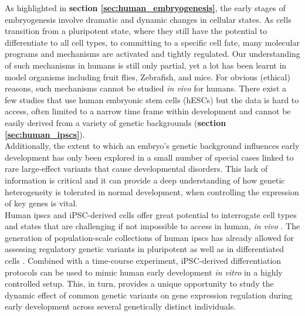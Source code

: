 As highlighted in \textbf{section 
\ref{sec:human_embryogenesis}},
the early stages of embryogenesis involve dramatic and dynamic changes in cellular states. 
As cells transition from a pluripotent state, where they still have the potential to differentiate to all cell types, to committing to a specific cell fate, many molecular programs and mechanisms are activated and tightly regulated.
Our understanding of such mechanisms in humans is still only partial, yet a lot has been learnt in model organisms including fruit flies, Zebrafish, and mice.
For obvious (ethical) reasons, such mechanisms cannot be studied \textit{in vivo} for humans. 
There exist a few studies that use human embryonic stem cells (hESCs) but the data is hard to access, often limited to a narrow time frame within development and cannot be easily derived from a variety of genetic backgrounds 
(\textbf{section 
\ref{sec:human_ipscs}}).
\\

Additionally, the extent to which an embryo’s genetic background influences early development has only been explored in a small number of special cases linked to rare large-effect variants that cause developmental disorders. 
This lack of information is critical and it can provide a deep understanding of how genetic heterogeneity is tolerated in normal development, when controlling the expression of key genes is vital.\\

Human \gls{ipsc}s and iPSC-derived cells offer great potential to interrogate cell types and states that are challenging if not impossible to access in human, \textit{in vivo} \cite{kilpinen2017common}.
The generation of population-scale collections of human \gls{ipsc}s \cite{kilpinen2017common, carcamo2017analysis} has already allowed for assessing regulatory genetic variants in pluripotent \cite{kilpinen2017common, carcamo2017analysis} as well as in differentiated cells \cite{schwartzentruber2018molecular, alasoo2018shared, pashos2017large}.
Combined with a time-course experiment, iPSC-derived differentiation protocols can be used to mimic human early development \textit{in vitro} in a highly controlled setup. This, in turn, provides a unique opportunity to study the dynamic effect of common genetic variants on gene expression regulation during early development across several genetically distinct individuals.

